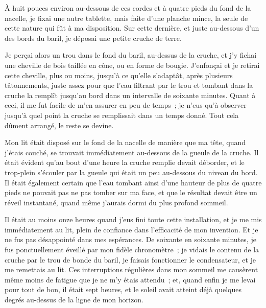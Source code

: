 \documentclass[french,twoside]{book} %
\begin{document}
À huit pouces environ au-dessous de ces cordes et à quatre pieds du fond de la nacelle, je fixai une autre tablette, mais faite d’une planche mince, la seule de cette nature qui fût à ma disposition. Sur cette dernière, et juste au-dessous d’un des bords du baril, je déposai une petite cruche de terre.\par
Je perçai alors un trou dans le fond du baril, au-dessus de la cruche, et j’y fichai une cheville de bois taillée en cône, ou en forme de bougie. J’enfonçai et je retirai cette cheville, plus ou moins, jusqu’à ce qu’elle s’adaptât, après plusieurs tâtonnements, juste assez pour que l’eau filtrant par le trou et tombant dans la cruche la remplît jusqu’au bord dans un intervalle de soixante minutes. Quant à ceci, il me fut facile de m’en assurer en peu de temps ; je n’eus qu’à observer jusqu’à quel point la cruche se remplissait dans un temps donné. Tout cela dûment arrangé, le reste se devine.\par
Mon lit était disposé sur le fond de la nacelle de manière que ma tête, quand j’étais couché, se trouvait immédiatement au-dessous de la gueule de la cruche. Il était évident qu’au bout d’une heure la cruche remplie devait déborder, et le trop-plein s’écouler par la gueule qui était un peu au-dessous du niveau du bord. Il était également certain que l’eau tombant ainsi d’une hauteur de plus de quatre pieds ne pouvait pas ne pas tomber sur ma face, et que le résultat devait être un réveil instantané, quand même j’aurais dormi du plus profond sommeil.\par
Il était au moins onze heures quand j’eus fini toute cette installation, et je me mis immédiatement au lit, plein de confiance dans l’efficacité de mon invention. Et je ne fus pas désappointé dans mes espérances. De soixante en soixante minutes, je fus ponctuellement éveillé par mon fidèle chronomètre ; je vidais le contenu de la cruche par le trou de bonde du baril, je faisais fonctionner le condensateur, et je me remettais au lit. Ces interruptions régulières dans mon sommeil me causèrent même moins de fatigue que je ne m’y étais attendu ; et, quand enfin je me levai pour tout de bon, il était sept heures, et le soleil avait atteint déjà quelques degrés au-dessus de la ligne de mon horizon.\par
\end{document}
